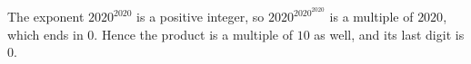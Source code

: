 The exponent $2020^{2020}$ is a positive integer, so $2020^{2020^{2020}}$ is a multiple of $2020$, which ends in $0$. Hence the product is a multiple of $10$ as well, and its last digit is $\boxed{0}$.
